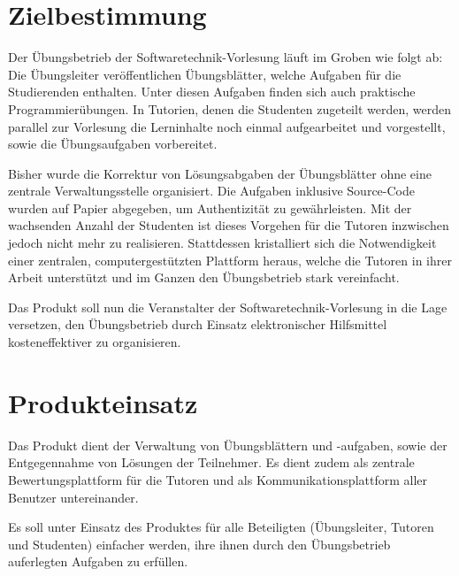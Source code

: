 \documentclass[a4paper,10pt]{article}
\title{\doctitle}
\author{\authorName}
\date{\today}
\begin{document}

\tableofcontents          %

\section{Zielbestimmung}

Der Übungsbetrieb der Softwaretechnik-Vorlesung läuft im Groben wie folgt ab: Die Übungsleiter veröffentlichen Übungsblätter, welche Aufgaben für die Studierenden enthalten.  Unter diesen Aufgaben finden sich auch praktische Programmierübungen.  In Tutorien, denen die Studenten zugeteilt werden, werden parallel zur Vorlesung die Lerninhalte noch einmal aufgearbeitet und vorgestellt, sowie die Übungsaufgaben vorbereitet.

Bisher wurde die Korrektur von Lösungsabgaben der Übungsblätter ohne eine zentrale Verwaltungsstelle organisiert.  Die Aufgaben inklusive Source-Code wurden auf Papier abgegeben, um Authentizität zu gewährleisten.  Mit der wachsenden Anzahl der Studenten ist dieses Vorgehen für die Tutoren inzwischen jedoch nicht mehr zu realisieren.  Stattdessen kristalliert sich die Notwendigkeit einer zentralen, computergestützten Plattform heraus, welche die Tutoren in ihrer Arbeit unterstützt und im Ganzen den Übungsbetrieb stark vereinfacht.

Das Produkt soll nun die Veranstalter der Softwaretechnik-Vorlesung in die Lage versetzen, den Übungsbetrieb durch Einsatz elektronischer Hilfsmittel kosteneffektiver zu organisieren.

\section{Produkteinsatz}

Das Produkt dient der Verwaltung von Übungsblättern und -aufgaben, sowie der Entgegennahme von Lösungen der Teilnehmer.  Es dient zudem als zentrale Bewertungsplattform für die Tutoren und als Kommunikationsplattform aller Benutzer untereinander.

Es soll unter Einsatz des Produktes für alle Beteiligten (Übungsleiter, Tutoren und Studenten) einfacher werden, ihre ihnen durch den Übungsbetrieb auferlegten Aufgaben zu erfüllen.
\end{document}
